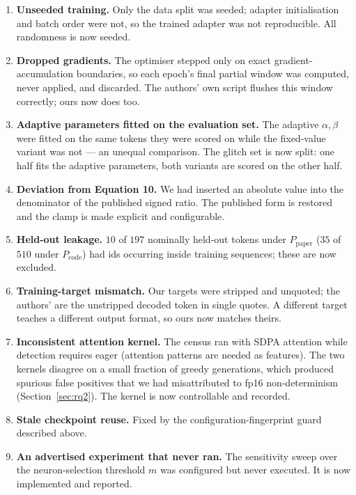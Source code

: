 \documentclass[11pt,a4paper]{article}
\newcommand{\Ppaper}{$P_{\mathrm{paper}}$}
\newcommand{\Pcode}{$P_{\mathrm{code}}$}
\begin{document}
\begin{enumerate}[leftmargin=*,label=D\arabic*.]
\item \textbf{Unseeded training.} Only the data split was seeded; adapter
initialisation and batch order were not, so the trained adapter was not
reproducible. All randomness is now seeded.
\item \textbf{Dropped gradients.} The optimiser stepped only on exact
gradient-accumulation boundaries, so each epoch's final partial window was
computed, never applied, and discarded. The authors' own script flushes this
window correctly; ours now does too.
\item \textbf{Adaptive parameters fitted on the evaluation set.} The adaptive
$\alpha,\beta$ were fitted on the same tokens they were scored on while the
fixed-value variant was not --- an unequal comparison. The glitch set is now split:
one half fits the adaptive parameters, both variants are scored on the other half.
\item \textbf{Deviation from Equation 10.} We had inserted an absolute value into
the denominator of the published signed ratio. The published form is restored and
the clamp is made explicit and configurable.
\item \textbf{Held-out leakage.} $10$ of $197$ nominally held-out tokens under
\Ppaper{} ($35$ of $510$ under \Pcode{}) had ids occurring inside training
sequences; these are now excluded.
\item \textbf{Training-target mismatch.} Our targets were stripped and unquoted;
the authors' are the unstripped decoded token in single quotes. A different target
teaches a different output format, so ours now matches theirs.
\item \textbf{Inconsistent attention kernel.} The census ran with SDPA attention
while detection requires eager (attention patterns are needed as features). The
two kernels disagree on a small fraction of greedy generations, which produced
spurious false positives that we had misattributed to fp16 non-determinism
(Section~\ref{sec:rq2}). The kernel is now controllable and recorded.
\item \textbf{Stale checkpoint reuse.} Fixed by the configuration-fingerprint
guard described above.
\item \textbf{An advertised experiment that never ran.} The sensitivity sweep over
the neuron-selection threshold $m$ was configured but never executed. It is now
implemented and reported.
\end{enumerate}
\end{document}
